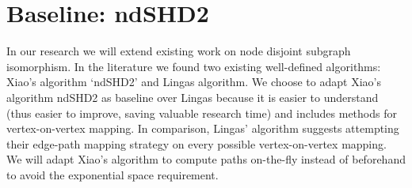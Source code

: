 %
%
%
%
%
%
%
%




\section{Baseline: ndSHD2}
In our research we will extend existing work on node disjoint subgraph isomorphism. In the literature we found two existing well-defined algorithms: Xiao's algorithm `ndSHD2'\cite{XIAONODEDISJOINT} and Lingas algorithm\cite{LINGAS2009464}. We choose to adapt Xiao's algorithm ndSHD2 as baseline over Lingas because it is easier to understand (thus easier to improve, saving valuable research time) and includes methods for vertex-on-vertex mapping. In comparison, Lingas' algorithm suggests attempting their edge-path mapping strategy on every possible vertex-on-vertex mapping. We will adapt Xiao's algorithm to compute paths on-the-fly instead of beforehand to avoid the exponential space requirement.

